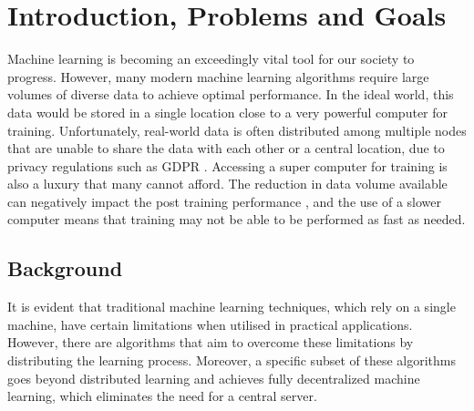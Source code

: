 \chapter{Introduction, Problems and Goals}
Machine learning is becoming an exceedingly vital tool for our society to progress. However, many modern machine learning algorithms require large volumes of diverse data to achieve optimal performance. In the ideal world, this data would be stored in a single location close to a very powerful computer for training. Unfortunately, real-world data is often distributed among multiple nodes that are unable to share the data with each other or a central location, due to privacy regulations such as GDPR \cite{gdpr}. Accessing a super computer for training is also a luxury that many cannot afford. The reduction in data volume available can negatively impact the post training performance \cite{data_volume}, and the use of a slower computer means that training may not be able to be performed as fast as needed.

\section{Background}
It is evident that traditional machine learning techniques, which rely on a single machine, have certain limitations when utilised in practical applications. However, there are algorithms that aim to overcome these limitations by distributing the learning process. Moreover, a specific subset of these algorithms goes beyond distributed learning and achieves fully decentralized machine learning, which eliminates the need for a central server.

